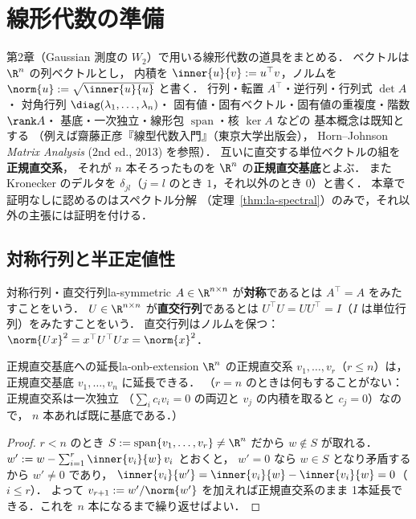 \chapter{線形代数の準備}
\label{ch:found-linalg}

第2章（Gaussian 測度の $W_2$）で用いる線形代数の道具をまとめる．
ベクトルは $\R^n$ の列ベクトルとし，
内積を $\inner{u}{v}:=u^\top v$，ノルムを $\norm{u}:=\sqrt{\inner{u}{u}}$ と書く．
行列・転置 $A^\top$・逆行列・行列式 $\det A$・
対角行列 $\diag(\lambda_1,\dots,\lambda_n)$・
固有値・固有ベクトル・固有値の重複度・階数 $\rank A$・
基底・一次独立・線形包 $\operatorname{span}$・核 $\ker A$ などの
基本概念は既知とする
（例えば齋藤正彦『線型代数入門』（東京大学出版会），
Horn--Johnson \emph{Matrix Analysis} (2nd ed., 2013) を参照）．
互いに直交する単位ベクトルの組を\textbf{正規直交系}，
それが $n$ 本そろったものを $\R^n$ の\textbf{正規直交基底}とよぶ．
また Kronecker のデルタを
$\delta_{jl}$（$j=l$ のとき $1$，それ以外のとき $0$）と書く．
本章で証明なしに認めるのはスペクトル分解
（定理~\ref{thm:la-spectral}）のみで，それ以外の主張には証明を付ける．

\section{対称行列と半正定値性}

\begin{definition}{対称行列・直交行列}{la-symmetric}
  $A\in\R^{n\times n}$ が\textbf{対称}であるとは $A^\top=A$ をみたすことをいう．
  $U\in\R^{n\times n}$ が\textbf{直交行列}であるとは
  $U^\top U=UU^\top=I$（$I$ は単位行列）をみたすことをいう．
  直交行列はノルムを保つ：
  $\norm{Ux}^2=x^\top U^\top Ux=\norm{x}^2$．
\end{definition}

\begin{claim}{正規直交基底への延長}{la-onb-extension}
  $\R^n$ の正規直交系 $v_1,\dots,v_r$（$r\leq n$）は，
  正規直交基底 $v_1,\dots,v_n$ に延長できる．
  （$r=n$ のときは何もすることがない：正規直交系は一次独立
  （$\sum_ic_iv_i=0$ の両辺と $v_j$ の内積を取ると $c_j=0$）なので，
  $n$ 本あれば既に基底である．）
\end{claim}

\begin{proof}
  $r<n$ のとき $S:=\operatorname{span}\{v_1,\dots,v_r\}\neq\R^n$ だから
  $w\notin S$ が取れる．
  $w':=w-\sum_{i=1}^r\inner{v_i}{w}\,v_i$ とおくと，
  $w'=0$ なら $w\in S$ となり矛盾するから $w'\neq0$ であり，
  $\inner{v_i}{w'}=\inner{v_i}{w}-\inner{v_i}{w}=0$（$i\leq r$）．
  よって $v_{r+1}:=w'/\norm{w'}$ を加えれば正規直交系のまま
  1本延長できる．これを $n$ 本になるまで繰り返せばよい．
\end{proof}

